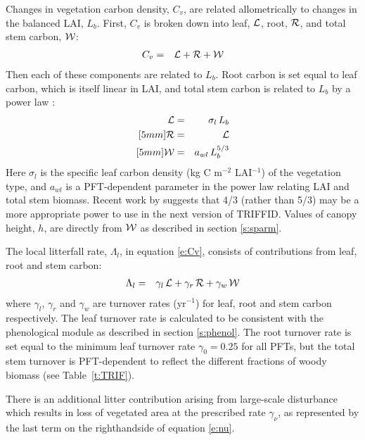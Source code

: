 \documentclass[a4paper]{article}
\begin{document}
Changes in vegetation carbon density, $C_v$, are related
allometrically to changes in the balanced LAI, $L_b$.  First, $C_v$ is
broken down into leaf, $\cal{L}$, root, $\cal{R}$, and total stem
carbon, $\cal{W}$:
\begin{eqnarray}
C_v &=& {\cal L} + {\cal R} + {\cal W}
\label{e:Cv2}
\end{eqnarray}
Then each of these components are related to $L_b$. Root carbon is set
equal to leaf carbon, which is itself linear in LAI, and total stem
carbon is related to $L_b$ by a power law \citep{Enq98}:
\begin{eqnarray}
{\cal L} &=& \sigma_l \, L_{b} \label{e:L_LAI}\\ [5mm]
{\cal R} &=& {\cal L} \label{e:R_L} \\ [5mm]
{\cal W} &=& a_{wl} \, L_{b}^{5/3} \label{e:W_L}
\end{eqnarray}
Here $\sigma_l$ is the specific leaf carbon density (kg C m$^{-2}$
LAI$^{-1}$) of the vegetation type, and $a_{wl}$ is a PFT-dependent
parameter in the power law relating LAI and total stem biomass.
Recent work by \citet{Enq98} suggests that 4/3 (rather than 5/3)
may be a more appropriate power to use in the next version of TRIFFID.
Values of canopy height, $h$, are directly from ${\cal W}$ as
described in section \ref{s:sparm}.

The local litterfall rate, $\Lambda_l$, in equation \eqref{e:Cv},
consists of contributions from leaf, root and stem carbon:
\begin{eqnarray}
\Lambda_l &=&\gamma_{l} \, {\cal L} + \gamma_{r} \, {\cal R} + \gamma_{w} \, {\cal W}
\label{e:lambdal}
\end{eqnarray}
where $\gamma_{l}$, $\gamma_{r}$ and $\gamma_{w}$ are turnover rates
(yr$^{-1}$) for leaf, root and stem carbon respectively. The leaf
turnover rate is calculated to be consistent with the phenological
module as described in section \ref{s:phenol}. The root turnover
rate is set equal to the minimum leaf turnover rate $\gamma_{0}=0.25$
for all PFTs, but the total stem turnover is PFT-dependent to reflect
the different fractions of woody biomass (see Table~\ref{t:TRIF}).

There is an additional litter contribution arising from large-scale
disturbance which results in loss of vegetated area at the prescribed
rate $\gamma_{\nu}$, as represented by the last term on the
righthandside of equation \eqref{e:nu}.
\end{document}
